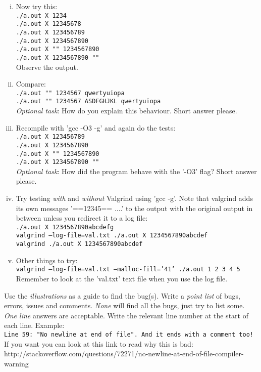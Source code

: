 \documentclass[10pt,a4paper]{article}
\begin{document}
\begin{enumerate}[a)]
\begin{enumerate}[i)]
		\item Now try this:
{\tt {\\
./a.out X 1234\\
./a.out X 12345678\\
./a.out X 123456789\\
./a.out X 1234567890\\
./a.out X "" 1234567890\\
./a.out X 1234567890 ""\\}}
Observe the output.

\item Compare:
{\tt {\\
./a.out "" 1234567 qwertyuiopa\\
./a.out "" 1234567 ASDFGHJKL qwertyuiopa}}\\
\emph {Optional task}: How do you explain this behaviour. Short answer please.

\item Recompile with 'gcc -O3 -g' and again do the tests:
{\tt {\\
./a.out X 123456789\\
./a.out X 1234567890\\
./a.out X "" 1234567890\\
./a.out X 1234567890 ""}\\
}
\emph {Optional task}: How did the program behave with the '-O3' flag? Short answer please.

\item Try testing \emph{with} and \emph{without} Valgrind using 'gcc -g'. Note that valgrind adds its own messages '==12345== ....' to the output with the original output in between unless you redirect it to a log file:
{\tt {\\
./a.out X 1234567890abcdefg\\
valgrind --log-file=val.txt ./a.out X 1234567890abcdef\\
valgrind ./a.out X 1234567890abcdef}}\\

\item Other things to try:
{\tt {\\
valgrind --log-file=val.txt --malloc-fill='41' ./a.out 1 2 3 4 5 }}\\
Remember to look at the 'val.txt' text file when you use the log file.

	\end{enumerate}
	Use the \emph {illustrations} as a guide to find the bug(s). Write a \emph {point list} of bugs, errors, issues and comments. \emph {None} will find all the bugs, just try to list some. \emph {One line} answers are acceptable. Write the relevant line number at the start of each line. Example: 
	{\tt {\\
Line 59: "No newline at end of file". And it ends with a comment too!}}\\
If you want you can look at this link to read why this is bad: http://stackoverflow.com/questions/72271/no-newline-at-end-of-file-compiler-warning




\end{enumerate}
\end{document}
